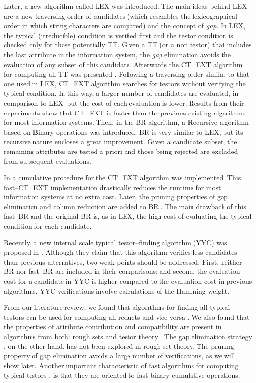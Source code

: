 \documentclass[number,preprint,review,12pt]{elsarticle}
\begin{document}
  Later, a new algorithm called LEX \cite{Santiesteban03} was introduced. The main ideas behind LEX are a new traversing order of candidates (which resembles the lexicographical order in which string characters are compared) and the concept of \emph{gap}. In LEX, the typical (irreducible) condition is verified first and the testor condition is checked only for those potentially TT. Given a TT (or a non testor) that includes the last attribute in the information system, the \emph{gap} elimination avoids the evaluation of any subset of this candidate. Afterwards the CT\_EXT algorithm for computing all TT was presented \cite{Sanchez07}. Following a traversing order similar to that one used in LEX, CT\_EXT algorithm searches for testors without verifying the typical condition. In this way, a larger number of candidates are evaluated, in comparison to LEX; but the cost of each evaluation is lower. Results from their experiments show that CT\_EXT is faster than the previous existing algorithms for most information systems. Then, in \cite{Lias09} the BR algorithm, a \textbf{R}ecursive algorithm based on \textbf{B}inary operations was introduced. BR is very similar to LEX, but its recursive nature encloses a great improvement. Given a candidate subset, the remaining attributes are tested a priori and those being rejected are excluded from subsequent evaluations. 
  
  In \cite{Sanchez10} a cumulative procedure for the CT\_EXT algorithm was implemented. This fast--CT\_EXT implementation drastically reduces the runtime for most information systems at no extra cost. Later, the pruning properties of gap elimination and column reduction are added to BR \citep{Lias13}. The main drawback of this fast--BR and the original BR is, as in LEX, the high cost of evaluating the typical condition for each candidate.
  
  Recently, a new internal scale typical testor--finding algorithm (YYC) was proposed in \cite{Alba14}.   Although they claim that this algorithm verifies less candidates than previous alternatives, two weak points should be addressed. First, neither BR nor fast--BR are included in their comparisons; and second, the evaluation cost for a candidate in YYC is higher compared to the evaluation cost in previous algorithms. YYC verifications involve calculations of the Hamming weight.
  
  From our literature review, we found that algorithms for finding all typical testors can be used for computing all reducts and vice versa \citep{Lazo15}. We also found that the properties of attribute contribution and compatibility are present in algorithms from both: rough sets \citep{WangP07} and testor theory \citep{Sanchez10,Lias13}. The gap elimination strategy \citep{Santiesteban03,Lias13}, on the other hand, has not been explored in rough set theory. The pruning property of gap elimination avoids a large number of verifications, as we will show later. Another important characteristic of fast algorithms for computing typical testors \citep{Sanchez10,Lias13}, is that they are oriented to fast binary cumulative operations. 
  
\end{document}
